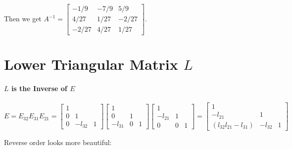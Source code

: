 \vspace{8pt}
\noindent Then we get $A^{-1} = \begin{bmatrix}
        -1/9  & -7/9 & 5/9   \\
        4/27  & 1/27 & -2/27 \\
        -2/27 & 4/27 & 1/27
    \end{bmatrix}$.

\section{Lower Triangular Matrix $L$}

\paragraph{$L$ is the Inverse of $E$}

\[
    E = E_{32}E_{31}E_{21} =
    \begin{bmatrix}
        1               \\
        0 & 1           \\
        0 & -l_{32} & 1
    \end{bmatrix}
    \begin{bmatrix}
        1               \\
        0       & 1     \\
        -l_{31} & 0 & 1
    \end{bmatrix}
    \begin{bmatrix}
        1               \\
        -l_{21} & 1     \\
        0       & 0 & 1
    \end{bmatrix}
    =
    \begin{bmatrix}
        1                                     \\
        -l_{21}                 & 1           \\
        (l_{32}l_{21} - l_{31}) & -l_{32} & 1
    \end{bmatrix}
\]

\noindent Reverse order looks more beautiful:

